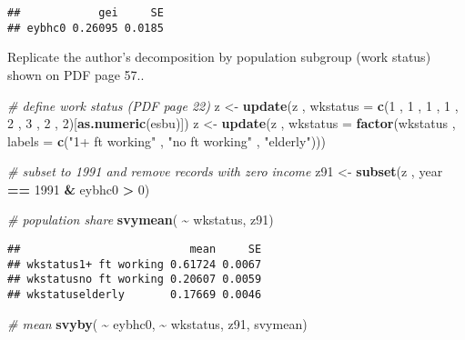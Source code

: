 \documentclass[
]{book}
\newenvironment{Shaded}{\begin{snugshade}}{\end{snugshade}}
\newcommand{\AttributeTok}[1]{\textcolor[rgb]{0.13,0.29,0.53}{#1}}
\newcommand{\CommentTok}[1]{\textcolor[rgb]{0.56,0.35,0.01}{\textit{#1}}}
\newcommand{\DecValTok}[1]{\textcolor[rgb]{0.00,0.00,0.81}{#1}}
\newcommand{\FunctionTok}[1]{\textcolor[rgb]{0.13,0.29,0.53}{\textbf{#1}}}
\newcommand{\NormalTok}[1]{#1}
\newcommand{\OtherTok}[1]{\textcolor[rgb]{0.56,0.35,0.01}{#1}}
\newcommand{\SpecialCharTok}[1]{\textcolor[rgb]{0.81,0.36,0.00}{\textbf{#1}}}
\newcommand{\StringTok}[1]{\textcolor[rgb]{0.31,0.60,0.02}{#1}}
\begin{document}
\begin{verbatim}
##            gei     SE
## eybhc0 0.26095 0.0185
\end{verbatim}

Replicate the author's decomposition by population subgroup (work status) shown on PDF page 57..

\begin{Shaded}
\begin{Highlighting}[]
\CommentTok{\# define work status (PDF page 22)}
\NormalTok{z }\OtherTok{\textless{}{-}}
  \FunctionTok{update}\NormalTok{(z , }\AttributeTok{wkstatus =} \FunctionTok{c}\NormalTok{(}\DecValTok{1}\NormalTok{ , }\DecValTok{1}\NormalTok{ , }\DecValTok{1}\NormalTok{ , }\DecValTok{1}\NormalTok{ , }\DecValTok{2}\NormalTok{ , }\DecValTok{3}\NormalTok{ , }\DecValTok{2}\NormalTok{ , }\DecValTok{2}\NormalTok{)[}\FunctionTok{as.numeric}\NormalTok{(esbu)])}
\NormalTok{z }\OtherTok{\textless{}{-}}
  \FunctionTok{update}\NormalTok{(z , }\AttributeTok{wkstatus =} \FunctionTok{factor}\NormalTok{(wkstatus , }\AttributeTok{labels =} \FunctionTok{c}\NormalTok{(}\StringTok{"1+ ft working"}\NormalTok{ , }\StringTok{"no ft working"}\NormalTok{ , }\StringTok{"elderly"}\NormalTok{)))}

\CommentTok{\# subset to 1991 and remove records with zero income}
\NormalTok{z91 }\OtherTok{\textless{}{-}} \FunctionTok{subset}\NormalTok{(z , year }\SpecialCharTok{==} \DecValTok{1991} \SpecialCharTok{\&}\NormalTok{ eybhc0 }\SpecialCharTok{\textgreater{}} \DecValTok{0}\NormalTok{)}

\CommentTok{\# population share}
\FunctionTok{svymean}\NormalTok{( }\SpecialCharTok{\textasciitilde{}}\NormalTok{ wkstatus, z91)}
\end{Highlighting}
\end{Shaded}

\begin{verbatim}
##                          mean     SE
## wkstatus1+ ft working 0.61724 0.0067
## wkstatusno ft working 0.20607 0.0059
## wkstatuselderly       0.17669 0.0046
\end{verbatim}

\begin{Shaded}
\begin{Highlighting}[]
\CommentTok{\# mean}
\FunctionTok{svyby}\NormalTok{( }\SpecialCharTok{\textasciitilde{}}\NormalTok{ eybhc0, }\SpecialCharTok{\textasciitilde{}}\NormalTok{ wkstatus, z91, svymean)}
\end{Highlighting}
\end{Shaded}
\end{document}
